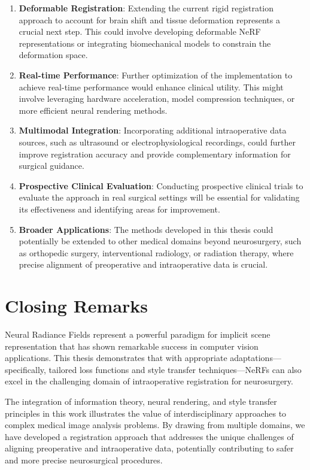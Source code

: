 \begin{enumerate}
    \item \textbf{Deformable Registration}: Extending the current rigid registration approach to account for brain shift and tissue deformation represents a crucial next step. This could involve developing deformable NeRF representations or integrating biomechanical models to constrain the deformation space.
    
    \item \textbf{Real-time Performance}: Further optimization of the implementation to achieve real-time performance would enhance clinical utility. This might involve leveraging hardware acceleration, model compression techniques, or more efficient neural rendering methods.
    
    \item \textbf{Multimodal Integration}: Incorporating additional intraoperative data sources, such as ultrasound or electrophysiological recordings, could further improve registration accuracy and provide complementary information for surgical guidance.
    
    \item \textbf{Prospective Clinical Evaluation}: Conducting prospective clinical trials to evaluate the approach in real surgical settings will be essential for validating its effectiveness and identifying areas for improvement.
    
    \item \textbf{Broader Applications}: The methods developed in this thesis could potentially be extended to other medical domains beyond neurosurgery, such as orthopedic surgery, interventional radiology, or radiation therapy, where precise alignment of preoperative and intraoperative data is crucial.
\end{enumerate}

\section{Closing Remarks}

Neural Radiance Fields represent a powerful paradigm for implicit scene representation that has shown remarkable success in computer vision applications. This thesis demonstrates that with appropriate adaptations—specifically, tailored loss functions and style transfer techniques—NeRFs can also excel in the challenging domain of intraoperative registration for neurosurgery.

The integration of information theory, neural rendering, and style transfer principles in this work illustrates the value of interdisciplinary approaches to complex medical image analysis problems. By drawing from multiple domains, we have developed a registration approach that addresses the unique challenges of aligning preoperative and intraoperative data, potentially contributing to safer and more precise neurosurgical procedures.

